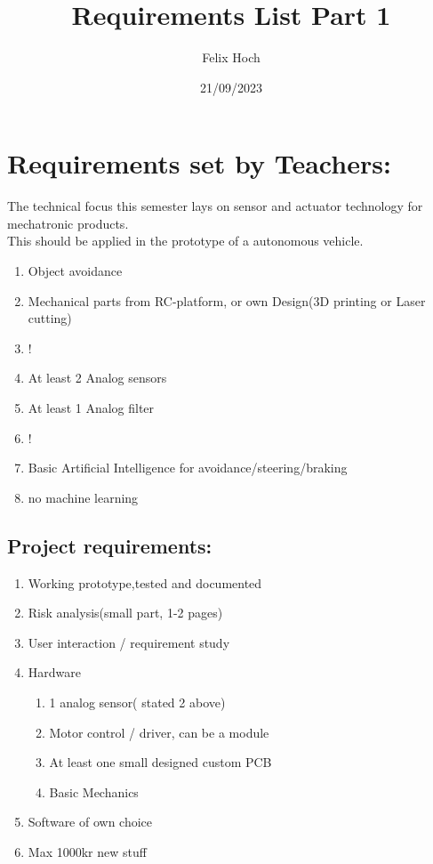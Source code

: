 \documentclass[11pt]{article}
\title{Requirements List Part 1}
\date{21/09/2023}
\author{Felix Hoch}
\begin{document}
\maketitle
\section*{Requirements set by Teachers:}
The technical focus this semester lays on sensor and actuator technology for mechatronic products.
\\
This should be applied in the prototype of a autonomous vehicle.
\begin{enumerate}
    \item Object avoidance
    \item Mechanical parts from RC-platform, or own Design(3D printing or Laser cutting)
    \item !
    \item At least 2 Analog sensors
    \item At least 1 Analog filter
    \item !
    \item Basic Artificial Intelligence for avoidance/steering/braking
    \item no machine learning
\end{enumerate}
\subsection{Project requirements:}
\begin{enumerate}
    \item Working prototype,tested and documented
    \item Risk analysis(small part, 1-2 pages)
    \item User interaction / requirement study
    \item Hardware\begin{enumerate}
        \item 1 analog sensor( stated 2 above)
        \item Motor control / driver, can be a module
        \item At least one small designed custom PCB
        \item Basic Mechanics

    \end{enumerate}
    \item Software of own choice
    \item Max 1000kr new stuff
\end{enumerate}
\end{document}
